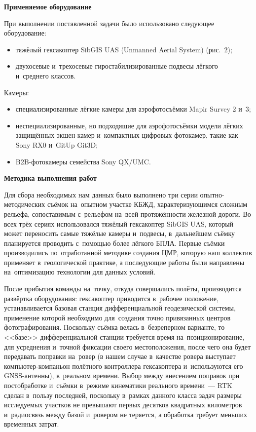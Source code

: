 \textbf{Применяемое оборудование}

При выполнении поставленной задачи было использовано следующее оборудование:

\begin{itemize}[noitemsep]\vspace{-8pt}
\item тяжёлый гексакоптер SibGIS UAS (Unmanned Aerial System) (рис.~2);
\item двухосевые и~трехосевые гиростабилизированные подвесы лёгкого и~среднего классов.
\end{itemize}
\vspace{-8pt}



Камеры:

\begin{itemize}[noitemsep]\vspace{-8pt}
\item специализированные лёгкие камеры для аэрофотосъёмки Mapir Survey 2 и~3;
\item неспециализированные, но подходящие для аэрофотосъёмки модели лёгких защищённых экшен-камер и~компактных цифровых фотокамер, такие как Sony RX0 и~GitUp Git3D;
\item B2B-фотокамеры семейства Sony QX/UMC.
\end{itemize}
\vspace{-8pt}

\textbf{Методика выполнения работ}

Для сбора необходимых нам данных было выполнено три серии опытно-методических съёмок на~опытном участке КБЖД, характеризующимся сложным рельефа, сопоставимым с~рельефом на~всей протяжённости железной дороги. Во всех трёх сериях использовался тяжёлый гексакоптер SibGIS UAS, который может переносить самые тяжёлые камеры и~подвесы, в~дальнейшем съёмку планируется проводить с~помощью более лёгкого БПЛА. Первые съёмки производились по~отработанной методике создания ЦМР, которую наш коллектив применяет в~геологической практике, а последующие работы были направлены на~оптимизацию технологии для данных условий.

После прибытия команды на~точку, откуда совершались полёты, производится развёртка оборудования: гексакоптер приводится в~рабочее положение, устанавливается базовая станция дифференциальной геодезической системы, применение которой необходимо для~создания точно привязанных центров фотографирования. Поскольку съёмка велась в~безреперном варианте, то <<базе>> дифференциальной станции требуется время на~позиционирование, для усреднения и~точной фиксации своего местоположения, после чего она будет передавать поправки на~ровер (в нашем случае в~качестве ровера выступает компьютер-компаньон полётного контроллера гексакоптера и~используются его GNSS-антенны), в~реальном времени. Выбор между внесением поправок при постобработке и~съёмки в~режиме кинематики реального времени~--- RTK сделан в~пользу последней, поскольку в~рамках данного класса задач размеры исследуемых участков не превышают первых десятков квадратных километров и~радиосвязь между базой и~ровером не теряется, а обработка требует меньших временных затрат.

